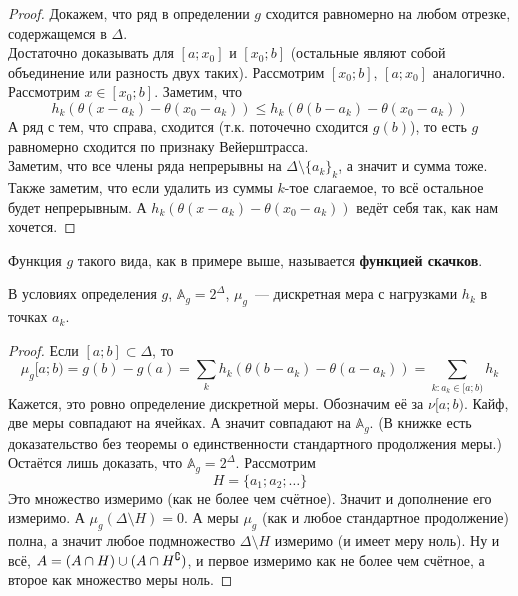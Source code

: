 \documentclass{article}
\begin{document}
\begin{example}
        \begin{proof}
            Докажем, что ряд в определении $g$ сходится равномерно на любом отрезке, содержащемся в $\Delta$.\\
            Достаточно доказывать для $[a;x_0]$ и $[x_0;b]$ (остальные являют собой объединение или разность двух таких). Рассмотрим $[x_0;b]$, $[a;x_0]$ аналогично.\\
            Рассмотрим $x\in[x_0;b]$. Заметим, что
            $$
            h_k(\theta(x-a_k)-\theta(x_0-a_k))\leqslant h_k(\theta(b-a_k)-\theta(x_0-a_k))
            $$
            А ряд с тем, что справа, сходится (т.к. поточечно сходится $g(b)$), то есть $g$ равномерно сходится по признаку Вейерштрасса.\\
            Заметим, что все члены ряда непрерывны на $\Delta\setminus\{a_k\}_k$, а значит и сумма тоже. Также заметим, что если удалить из суммы $k$-тое слагаемое, то всё остальное будет непрерывным. А $h_k(\theta(x-a_k)-\theta(x_0-a_k))$ ведёт себя так, как нам хочется.
        \end{proof}
    \end{example}
    \begin{definition}
        Функция $g$ такого вида, как в примере выше, называется \textbf{функцией скачков}.
    \end{definition}
    \begin{theorem}
        В условиях определения $g$, $\mathbb A_g=2^\Delta$, $\mu_g$~--- дискретная мера с нагрузками $h_k$ в точках $a_k$.
    \end{theorem}
    \begin{proof}
        Если $[a;b]\subset\Delta$, то
        $$
        \mu_g[a;b)=g(b)-g(a)=\sum\limits_kh_k(\theta(b-a_k)-\theta(a-a_k))=\sum\limits_{k:a_k\in[a;b)}h_k
        $$
        Кажется, это ровно определение дискретной меры. Обозначим её за $\nu[a;b)$. Кайф, две меры совпадают на ячейках. А значит совпадают на $\mathbb A_g$. (В книжке есть доказательство без теоремы о единственности стандартного продолжения меры.) Остаётся лишь доказать, что $\mathbb A_g=2^\Delta$. Рассмотрим
        $$H=\{a_1;a_2;\ldots\}$$
        Это множество измеримо (как не более чем счётное). Значит и дополнение его измеримо. А $\mu_g(\Delta\setminus H)=0$. А меры $\mu_g$ (как и любое стандартное продолжение) полна, а значит любое подмножество $\Delta\setminus H$ измеримо (и имеет меру ноль). Ну и всё, $A=(A\cap H)\cup(A\cap H^\complement)$, и первое измеримо как не более чем счётное, а второе как множество меры ноль.
    \end{proof}
\end{document}
